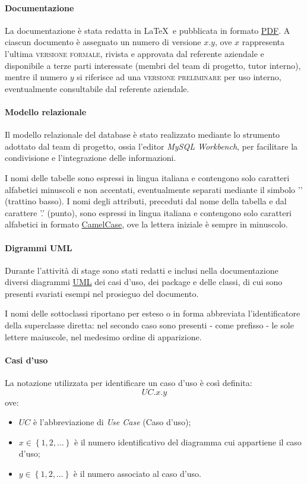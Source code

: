 \paragraph{Documentazione}
La documentazione è stata redatta in \LaTeX\ e pubblicata in formato \underline{PDF}. A ciascun documento è assegnato un numero di versione $x.y$, ove $x$ rappresenta l'ultima \textsc{versione formale}, rivista e approvata dal referente aziendale e disponibile a terze parti interessate (membri del team di progetto, tutor interno), mentre il numero $y$ si riferisce ad una \textsc{versione preliminare} per uso interno, eventualmente consultabile dal referente aziendale.

\paragraph{Modello relazionale}
Il modello relazionale del database è stato realizzato mediante lo strumento adottato dal team di progetto, ossia l'editor \textit{MySQL Workbench}, per facilitare la condivisione e l'integrazione delle informazioni.

I nomi delle tabelle sono espressi in lingua italiana e contengono solo caratteri alfabetici minuscoli e non accentati, eventualmente separati mediante il simbolo '\textunderscore' (trattino basso). I nomi degli attributi, preceduti dal nome della tabella e dal carattere '.' (punto), sono espressi in lingua italiana e contengono solo caratteri alfabetici in formato \underline{CamelCase}, ove la lettera iniziale è sempre in minuscolo.

\paragraph{Digrammi UML}
Durante l'attività di stage sono stati redatti e inclusi nella documentazione diversi diagrammi \underline{UML} dei casi d'uso, dei package e delle classi, di cui sono presenti svariati esempi nel prosieguo del documento.

I nomi delle sottoclassi riportano per esteso o in forma abbreviata l'identificatore della superclasse diretta: nel secondo caso sono presenti - come prefisso - le sole lettere maiuscole, nel medesimo ordine di apparizione.

\paragraph{Casi d'uso}
La notazione utilizzata per identificare un caso d'uso è così definita:
$$UC.x.y$$
ove:
\begin{itemize}
\item $UC$ è l'abbreviazione di \textit{Use Case} (Caso d'uso);
\item $x \in \left\{1,2,\ldots\right\}$ è il numero identificativo del diagramma cui appartiene il caso d'uso;
\item $y \in \left\{1,2,\ldots\right\}$ è il numero associato al caso d'uso.
\end{itemize}

